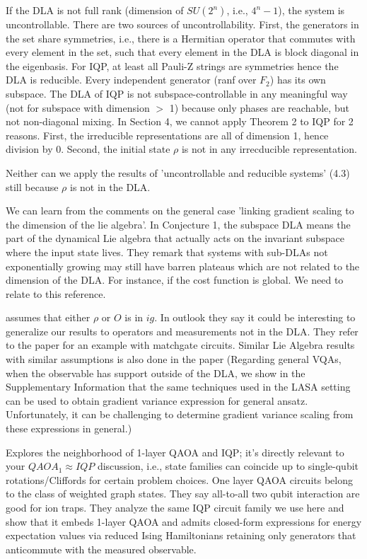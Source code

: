 \documentclass[a4paper,onecolumn,notitlepage,nofootinbib,longbibliography,superscriptaddress, floatfix, pra, aps, 10pt]{revtex4-2}
\begin{document}
If the DLA is not full rank (dimension of $SU(2^n)$, i.e., $4^n-1$), the system is uncontrollable. There are two sources of uncontrollability. First, the generators in the set share symmetries, i.e., there is a Hermitian operator that commutes with every element in the set, such that every element in the DLA is block diagonal in the eigenbasis. For IQP, at least all Pauli-Z strings are symmetries hence the DLA is reducible. Every independent generator (ranf over $F_2$) has its own subspace. The DLA of IQP is not subspace-controllable in any meaningful way (not for subspace with dimension $>$ 1) because only phases are reachable, but not non-diagonal mixing. In Section 4, we cannot apply Theorem 2 to IQP for 2 reasons. First, the irreducible representations are all of dimension 1, hence division by 0. Second, the initial state $\rho$ is not in any irrecducible representation. 

Neither can we apply the results of 'uncontrollable and reducible systems' (4.3) still because $\rho$ is not in the DLA.

We can learn from the comments on the general case 'linking gradient scaling to the dimension of the lie algebra'. In Conjecture 1, the subspace DLA means the part of the dynamical Lie algebra that actually acts on the invariant subspace where the input state lives. They remark that systems with sub-DLAs not exponentially growing may still have barren plateaus which are not related to the dimension of the DLA. For instance, if the cost function is global. \cite{Cerezo2021CostFunctionBP} We need to relate to this reference. 

\cite{ragone_lie_2024} assumes that either $\rho$ or $O$ is in $ig$. In outlook they say it could be interesting to
generalize our results to operators and measurements not
in the DLA. They refer to the paper \cite{diaz2023showcasingbarrenplateautheory} for an example with matchgate circuits. Similar Lie Algebra results with similar assumptions is also done in the paper \cite{Fontana_2024} (Regarding general VQAs, when the observable has support outside of the DLA, we show in the Supplementary Information that the same techniques used in the
LASA setting can be used to obtain gradient variance
expression for general ansatz. Unfortunately, it can be
challenging to determine gradient variance scaling from
these expressions in general.)

\cite{Leontica_2024} Explores the neighborhood of 1-layer QAOA and IQP; it’s directly relevant to your $QAOA_1 \approx IQP$ discussion, i.e., state families can coincide up to single-qubit rotations/Cliffords for certain problem choices. One layer QAOA circuits belong to the class of weighted graph states. They say all-to-all two qubit interaction are good for ion traps. They analyze the same IQP circuit family we use here and show that it embeds 1-layer QAOA and admits closed-form expressions for energy expectation values via reduced Ising Hamiltonians retaining only generators that anticommute with the measured observable. 
\end{document}
